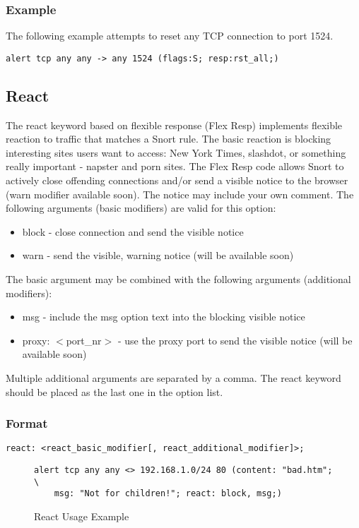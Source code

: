 \documentclass[english]{report}
\begin{document}
\subsubsection{Example}

The following example attempts to reset any TCP connection to port 1524.
\begin{verbatim}
alert tcp any any -> any 1524 (flags:S; resp:rst_all;)
\end{verbatim}


\subsection{React}

The react keyword based on flexible response (Flex Resp) implements flexible
reaction to traffic that matches a Snort rule. The basic reaction is blocking
interesting sites users want to access: New York Times, slashdot, or something
really important - napster and porn sites. The Flex Resp code allows Snort to
actively close offending connections and/or send a visible notice to the
browser (warn modifier available soon). The notice may include your own
comment. The following arguments (basic modifiers) are valid for this option:

\begin{itemize}
\item block - close connection and send the visible notice 
\item warn - send the visible, warning notice (will be available soon) 
\end{itemize}
The basic argument may be combined with the following arguments (additional
modifiers): 

\begin{itemize}
\item msg - include the msg option text into the blocking visible notice 
\item proxy: $<$port\_nr$>$ - use the proxy port to send the visible notice
(will be available soon)
\end{itemize}
Multiple additional arguments are separated by a comma. The react
keyword should be placed as the last one in the option list.


\subsubsection{Format}

\begin{verbatim}
react: <react_basic_modifier[, react_additional_modifier]>;
\end{verbatim}
%
\begin{figure}[!hbpt]
\begin{verbatim}
alert tcp any any <> 192.168.1.0/24 80 (content: "bad.htm"; \
    msg: "Not for children!"; react: block, msg;) 
\end{verbatim}
\caption{\label{react examples}React Usage Example}
\end{figure}
\end{document}
